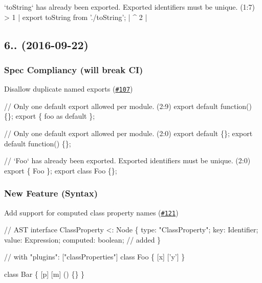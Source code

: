 \begin{DoxyCode}
`toString` has already been exported. Exported identifiers must be unique. (1:7)
> 1 | export toString from './toString';
    |        ^
  2 |
\end{DoxyCode}


\subsection*{6.. (2016-\/09-\/22)}

\subsubsection*{Spec Compliancy (will break CI)}


\begin{DoxyItemize}
\item Disallow duplicate named exports (\href{https://github.com/babel/babylon/pull/107}{\tt \#107}) 
\end{DoxyItemize}


\begin{DoxyCode}
// Only one default export allowed per module. (2:9)
export default function() \{\};
export \{ foo as default \};

// Only one default export allowed per module. (2:0)
export default \{\};
export default function() \{\};

// `Foo` has already been exported. Exported identifiers must be unique. (2:0)
export \{ Foo \};
export class Foo \{\};
\end{DoxyCode}


\subsubsection*{New Feature (Syntax)}


\begin{DoxyItemize}
\item Add support for computed class property names (\href{https://github.com/babel/babylon/pull/121}{\tt \#121}) 
\end{DoxyItemize}


\begin{DoxyCode}
// AST
interface ClassProperty <: Node \{
  type: "ClassProperty";
  key: Identifier;
  value: Expression;
  computed: boolean; // added
\}
\end{DoxyCode}



\begin{DoxyCode}
// with "plugins": ["classProperties"]
class Foo \{
  [x]
  ['y']
\}

class Bar \{
  [p]
  [m] () \{\}
\}
\end{DoxyCode}


